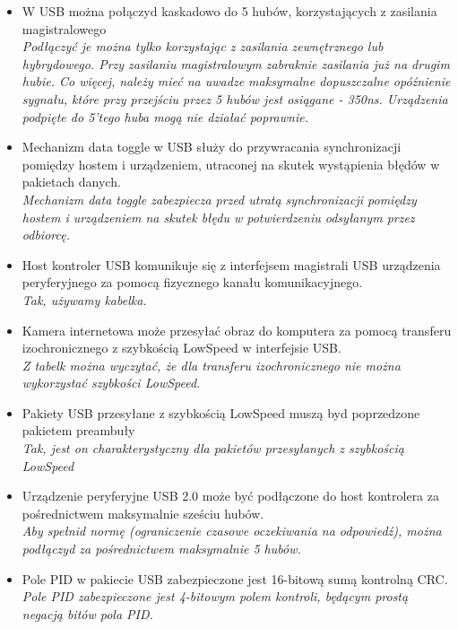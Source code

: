 \documentclass[a4paper,twoside]{article}
\begin{document}
\begin{itemize}
	\item \textcolor{nie}{W USB można połączyd kaskadowo do 5 hubów, korzystających z zasilania magistralowego} \\
	{\small \emph{Podłączyć je można tylko korzystając z zasilania zewnętrznego lub hybrydowego. Przy zasilaniu magistralowym zabraknie zasilania już na drugim hubie. Co więcej, należy mieć na uwadze maksymalne dopuszczalne opóźnienie sygnału, które przy przejściu przez 5 hubów jest osiągane - 350ns. Urządzenia podpięte do 5'tego huba mogą nie działać poprawnie.}}
	
	\item \textcolor{nie}{Mechanizm data toggle w USB służy do przywracania synchronizacji pomiędzy hostem i urządzeniem, utraconej na skutek wystąpienia błędów w pakietach danych.} \\
	{\small \emph{Mechanizm data toggle zabezpiecza przed utratą synchronizacji pomiędzy hostem i urządzeniem na skutek błędu w potwierdzeniu odsyłanym przez odbiorcę.}}
	
	\item \textcolor{tak}{Host kontroler USB komunikuje się z interfejsem magistrali USB urządzenia peryferyjnego za pomocą fizycznego kanału komunikacyjnego.} \\
	{\small \emph{Tak, używamy kabelka.}}
	
	\item \textcolor{nie}{Kamera internetowa może przesyłać obraz do komputera za pomocą transferu izochronicznego z szybkością LowSpeed w interfejsie USB.} \\
	{\small \emph{Z tabelk można wyczytać, że dla transferu izochronicznego nie można wykorzystać szybkości LowSpeed.}}
	
	\item \textcolor{tak}{Pakiety USB przesyłane z szybkością LowSpeed muszą byd poprzedzone pakietem preambuły} \\
	{\small \emph{Tak, jest on charakterystyczny dla pakietów przesyłanych z szybkością LowSpeed}}
	
	\item \textcolor{nie}{Urządzenie peryferyjne USB 2.0 może być podłączone do host kontrolera za pośrednictwem maksymalnie sześciu hubów.} \\
	{\small \emph{Aby spełnid normę (ograniczenie czasowe oczekiwania na odpowiedź), można podłączyd za pośrednictwem maksymalnie 5 hubów.}}
	
	\item \textcolor{nie}{Pole PID w pakiecie USB zabezpieczone jest 16-bitową sumą kontrolną CRC.} \\
	{\small \emph{Pole PID zabezpieczone jest 4-bitowym polem kontroli, będącym prostą negacją bitów pola PID.}}
	

\end{itemize}
\end{document}
